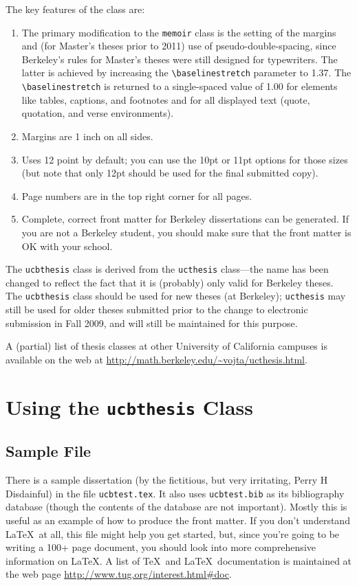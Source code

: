\documentclass[11pt]{article}
\newcommand*{\pkg}[1]{\texttt{#1}}
\begin{document}
\smallbreak
The key features of the class are:
\begin{enumerate}
\item The primary modification to the \pkg{memoir} class is the setting of the
  margins and (for Master's theses prior to 2011) use of pseudo-double-spacing,
  since Berkeley's rules for Master's theses were still designed
  for typewriters.  The latter is achieved by increasing the
  \verb|\baselinestretch| parameter to 1.37.  The \verb|\baselinestretch|
  is returned to a single-spaced value of 1.00 for elements like tables,
  captions, and footnotes and for all displayed text (quote, quotation,
  and verse environments).
\item Margins are 1 inch on all sides.
\item Uses 12 point by default; you can use the 10pt or 11pt options for
  those sizes (but note that only 12pt should be used for the final
  submitted copy).
\item Page numbers are in the top right corner for all pages.
\item Complete, correct front matter for Berkeley dissertations can be
  generated.  If you are not a Berkeley student, you should make sure
  that the front matter is OK with your school.
\end{enumerate}

The \pkg{ucbthesis} class is derived from the \pkg{ucthesis} class---the
name has been changed to reflect the fact that it is (probably) only
valid for Berkeley theses.
The \pkg{ucbthesis} class should be used for new theses (at Berkeley);
\pkg{ucthesis} may still be used for older theses submitted prior to the
change to electronic submission in Fall 2009, and will still be maintained
for this purpose.

A (partial) list of thesis classes at other University of California
campuses is available on the web at
\url{http://math.berkeley.edu/~vojta/ucthesis.html}.

\section{Using the \pkg{ucbthesis} Class}

\subsection{Sample File}

There is a sample dissertation (by the fictitious, but very
irritating, Perry H Disdainful) in the file \texttt{ucbtest.tex}.
It also uses \texttt{ucbtest.bib} as its bibliography database (though
the contents of the database are not important).  Mostly this is useful
as an example of
how to produce the front matter.  If you don't understand \LaTeX\ at
all, this file might help you get started, but, since you're going to
be writing a 100+ page document, you should look into more comprehensive
information on \LaTeX.  A list of \TeX\ and \LaTeX\ documentation is
maintained at the web page \url{http://www.tug.org/interest.html#doc}.
\end{document}
